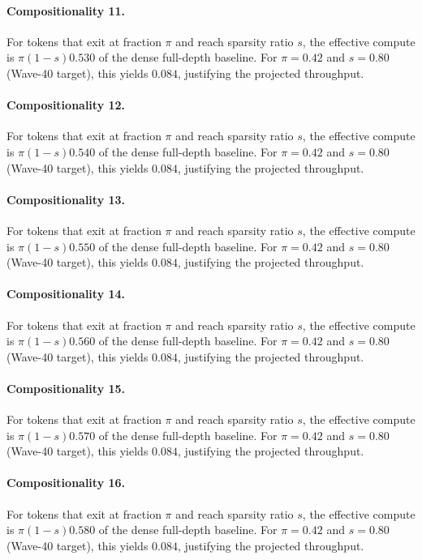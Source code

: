 \paragraph{Compositionality 11.}
For tokens that exit at fraction $\pi$ and reach sparsity ratio $s$, the
effective compute is $\pi(1-s)0.530$ of the dense full-depth
baseline. For $\pi = 0.42$ and $s = 0.80$ (Wave-40 target), this yields
$0.084$, justifying the projected throughput.

\paragraph{Compositionality 12.}
For tokens that exit at fraction $\pi$ and reach sparsity ratio $s$, the
effective compute is $\pi(1-s)0.540$ of the dense full-depth
baseline. For $\pi = 0.42$ and $s = 0.80$ (Wave-40 target), this yields
$0.084$, justifying the projected throughput.

\paragraph{Compositionality 13.}
For tokens that exit at fraction $\pi$ and reach sparsity ratio $s$, the
effective compute is $\pi(1-s)0.550$ of the dense full-depth
baseline. For $\pi = 0.42$ and $s = 0.80$ (Wave-40 target), this yields
$0.084$, justifying the projected throughput.

\paragraph{Compositionality 14.}
For tokens that exit at fraction $\pi$ and reach sparsity ratio $s$, the
effective compute is $\pi(1-s)0.560$ of the dense full-depth
baseline. For $\pi = 0.42$ and $s = 0.80$ (Wave-40 target), this yields
$0.084$, justifying the projected throughput.

\paragraph{Compositionality 15.}
For tokens that exit at fraction $\pi$ and reach sparsity ratio $s$, the
effective compute is $\pi(1-s)0.570$ of the dense full-depth
baseline. For $\pi = 0.42$ and $s = 0.80$ (Wave-40 target), this yields
$0.084$, justifying the projected throughput.

\paragraph{Compositionality 16.}
For tokens that exit at fraction $\pi$ and reach sparsity ratio $s$, the
effective compute is $\pi(1-s)0.580$ of the dense full-depth
baseline. For $\pi = 0.42$ and $s = 0.80$ (Wave-40 target), this yields
$0.084$, justifying the projected throughput.

